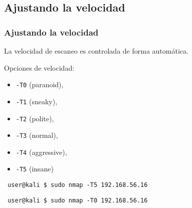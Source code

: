 \documentclass[aspectratio=169]{beamer}
\begin{document}
\subsection{Ajustando la velocidad}

\begin{frame}[fragile]
    \frametitle{Ajustando la velocidad}

    La velocidad de escaneo es controlada de forma autom\'atica.

  \pause

    \vspace{1em}
  
    Opciones de velocidad:

    \begin{itemize}
        \item \texttt{-T0} (paranoid), 
        \item \texttt{-T1} (sneaky), 
        \item \texttt{-T2} (polite),
        \item \texttt{-T3} (normal),
        \item \texttt{-T4} (aggressive),
        \item \texttt{-T5} (insane)
    \end{itemize}

    \pause

    \begin{lstlisting}
 user@kali $ sudo nmap -T5 192.168.56.16
    \end{lstlisting}

    \pause

    \begin{lstlisting}
 user@kali $ sudo nmap -T0 192.168.56.16
    \end{lstlisting}

\end{frame}
\end{document}
